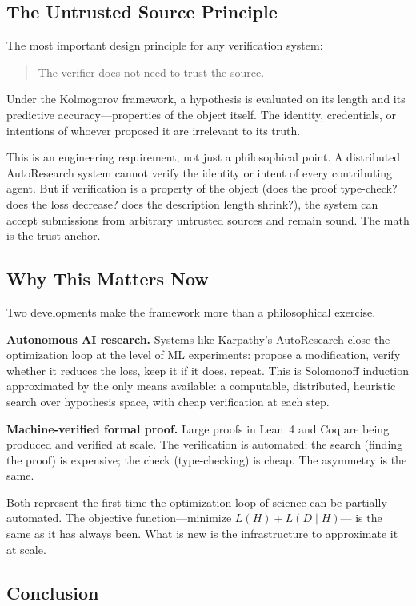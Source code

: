 \subsection{The Untrusted Source Principle}

The most important design principle for any verification system:
\begin{quote}
  The verifier does not need to trust the source.
\end{quote}
Under the Kolmogorov framework, a hypothesis is evaluated on its length and its predictive accuracy---properties of the object itself. The identity, credentials, or intentions of whoever proposed it are irrelevant to its truth.

This is an engineering requirement, not just a philosophical point. A distributed AutoResearch system cannot verify the identity or intent of every contributing agent. But if verification is a property of the object (does the proof type-check? does the loss decrease? does the description length shrink?), the system can accept submissions from arbitrary untrusted sources and remain sound. The math is the trust anchor.

\subsection{Why This Matters Now}

Two developments make the framework more than a philosophical exercise.

\textbf{Autonomous AI research.} Systems like Karpathy's AutoResearch close the optimization loop at the level of ML experiments: propose a modification, verify whether it reduces the loss, keep it if it does, repeat. This is Solomonoff induction approximated by the only means available: a computable, distributed, heuristic search over hypothesis space, with cheap verification at each step.

\textbf{Machine-verified formal proof.} Large proofs in Lean~4 and Coq are being produced and verified at scale. The verification is automated; the search (finding the proof) is expensive; the check (type-checking) is cheap. The asymmetry is the same.

Both represent the first time the optimization loop of science can be partially automated. The objective function---minimize $L(H) + L(D \mid H)$--- is the same as it has always been. What is new is the infrastructure to approximate it at scale.

\subsection{Conclusion}

